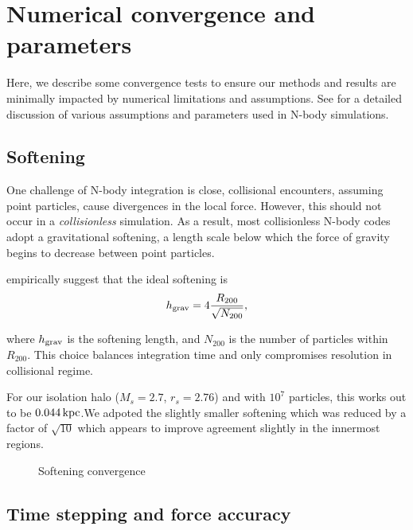 \chapter{Numerical convergence and
parameters}\label{sec:extra_convergence}

Here, we describe some convergence tests to ensure our methods and
results are minimally impacted by numerical limitations and assumptions.
See \citet{power+2003} for a detailed discussion of various assumptions
and parameters used in N-body simulations.

\section{Softening}\label{softening}

One challenge of N-body integration is close, collisional encounters,
assuming point particles, cause divergences in the local force. However,
this should not occur in a \emph{collisionless} simulation. As a result,
most collisionless N-body codes adopt a gravitational softening, a
length scale below which the force of gravity begins to decrease between
point particles.

\citet{power+2003} empirically suggest that the ideal softening is
\begin{equation}{
h_{\rm grav} = 4 \frac{R_{200}}{\sqrt{N_{200}}},
}\end{equation}

where \(h_{\rm grav}\) is the softening length, and \(N_{200}\) is the
number of particles within \(R_{200}\). This choice balances integration
time and only compromises resolution in collisional regime.

For our isolation halo (\(M_s=2.7\), \(r_s=2.76\)) and with \(10^7\)
particles, this works out to be \(0.044\,{\rm kpc}\).We adpoted the
slightly smaller softening which was reduced by a factor of
\(\sqrt{10}\) which appears to improve agreement slightly in the
innermost regions.

\begin{figure}
\centering
{}
\caption{Softening convergence}\label{fig:softening_convergence}
\end{figure}

\section{Time stepping and force
accuracy}\label{time-stepping-and-force-accuracy}

